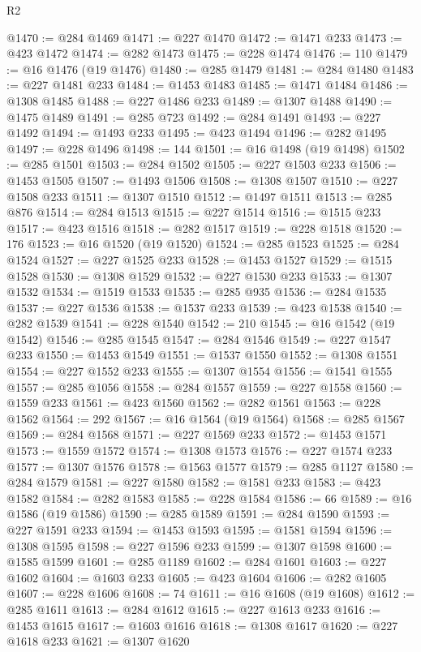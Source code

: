\begin{lexlean}{R2}
\begin{coremodule}
@1470 := @284 @1469
@1471 := @227 @1470
@1472 := @1471 @233
@1473 := @423 @1472
@1474 := @282 @1473
@1475 := @228 @1474
@1476 := 110
@1479 := @16 @1476 (@19 @1476)
@1480 := @285 @1479
@1481 := @284 @1480
@1483 := @227 @1481 @233
@1484 := @1453 @1483
@1485 := @1471 @1484
@1486 := @1308 @1485
@1488 := @227 @1486 @233
@1489 := @1307 @1488
@1490 := @1475 @1489
@1491 := @285 @723
@1492 := @284 @1491
@1493 := @227 @1492
@1494 := @1493 @233
@1495 := @423 @1494
@1496 := @282 @1495
@1497 := @228 @1496
@1498 := 144
@1501 := @16 @1498 (@19 @1498)
@1502 := @285 @1501
@1503 := @284 @1502
@1505 := @227 @1503 @233
@1506 := @1453 @1505
@1507 := @1493 @1506
@1508 := @1308 @1507
@1510 := @227 @1508 @233
@1511 := @1307 @1510
@1512 := @1497 @1511
@1513 := @285 @876
@1514 := @284 @1513
@1515 := @227 @1514
@1516 := @1515 @233
@1517 := @423 @1516
@1518 := @282 @1517
@1519 := @228 @1518
@1520 := 176
@1523 := @16 @1520 (@19 @1520)
@1524 := @285 @1523
@1525 := @284 @1524
@1527 := @227 @1525 @233
@1528 := @1453 @1527
@1529 := @1515 @1528
@1530 := @1308 @1529
@1532 := @227 @1530 @233
@1533 := @1307 @1532
@1534 := @1519 @1533
@1535 := @285 @935
@1536 := @284 @1535
@1537 := @227 @1536
@1538 := @1537 @233
@1539 := @423 @1538
@1540 := @282 @1539
@1541 := @228 @1540
@1542 := 210
@1545 := @16 @1542 (@19 @1542)
@1546 := @285 @1545
@1547 := @284 @1546
@1549 := @227 @1547 @233
@1550 := @1453 @1549
@1551 := @1537 @1550
@1552 := @1308 @1551
@1554 := @227 @1552 @233
@1555 := @1307 @1554
@1556 := @1541 @1555
@1557 := @285 @1056
@1558 := @284 @1557
@1559 := @227 @1558
@1560 := @1559 @233
@1561 := @423 @1560
@1562 := @282 @1561
@1563 := @228 @1562
@1564 := 292
@1567 := @16 @1564 (@19 @1564)
@1568 := @285 @1567
@1569 := @284 @1568
@1571 := @227 @1569 @233
@1572 := @1453 @1571
@1573 := @1559 @1572
@1574 := @1308 @1573
@1576 := @227 @1574 @233
@1577 := @1307 @1576
@1578 := @1563 @1577
@1579 := @285 @1127
@1580 := @284 @1579
@1581 := @227 @1580
@1582 := @1581 @233
@1583 := @423 @1582
@1584 := @282 @1583
@1585 := @228 @1584
@1586 := 66
@1589 := @16 @1586 (@19 @1586)
@1590 := @285 @1589
@1591 := @284 @1590
@1593 := @227 @1591 @233
@1594 := @1453 @1593
@1595 := @1581 @1594
@1596 := @1308 @1595
@1598 := @227 @1596 @233
@1599 := @1307 @1598
@1600 := @1585 @1599
@1601 := @285 @1189
@1602 := @284 @1601
@1603 := @227 @1602
@1604 := @1603 @233
@1605 := @423 @1604
@1606 := @282 @1605
@1607 := @228 @1606
@1608 := 74
@1611 := @16 @1608 (@19 @1608)
@1612 := @285 @1611
@1613 := @284 @1612
@1615 := @227 @1613 @233
@1616 := @1453 @1615
@1617 := @1603 @1616
@1618 := @1308 @1617
@1620 := @227 @1618 @233
@1621 := @1307 @1620

\end{coremodule}
\end{lexlean}
